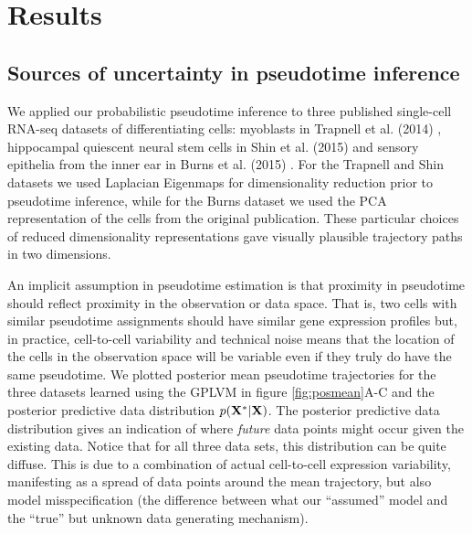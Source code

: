 \section{Results}



\subsection{Sources of uncertainty in pseudotime inference}

We applied our probabilistic pseudotime inference to three published single-cell RNA-seq datasets of differentiating cells: myoblasts in Trapnell et al. (2014) \cite{Trapnell2014-xi}, hippocampal quiescent neural stem cells in Shin et al. (2015) \cite{Shin2015} and sensory epithelia from the inner ear in Burns et al. (2015) \cite{Burns2015}. For the Trapnell and Shin datasets we used Laplacian Eigenmaps \cite{Belkin2003} for dimensionality reduction prior to pseudotime inference, while for the Burns dataset we used the PCA representation of the cells from the original publication. These particular choices of reduced dimensionality representations gave visually plausible trajectory paths in two dimensions.

An implicit assumption in pseudotime estimation is that proximity in pseudotime should reflect proximity in the observation or data space. That is, two cells with similar pseudotime assignments should have similar gene expression profiles but, in practice, cell-to-cell variability and technical noise means that the location of the cells in the observation space will be variable even if they truly do have the same pseudotime. We plotted posterior mean pseudotime trajectories for the three datasets learned using the GPLVM in figure \ref{fig:posmean}A-C and the posterior predictive data distribution $p({\bf X}^*|{\bf X})$. The posterior predictive data distribution gives an indication of where \emph{future} data points might occur given the existing data. Notice that for all three data sets, this distribution can be quite diffuse. This is due to a combination of actual cell-to-cell expression variability, manifesting as a spread of data points around the mean trajectory, but also model misspecification (the difference between what our ``assumed'' model and the ``true'' but unknown data generating mechanism).


